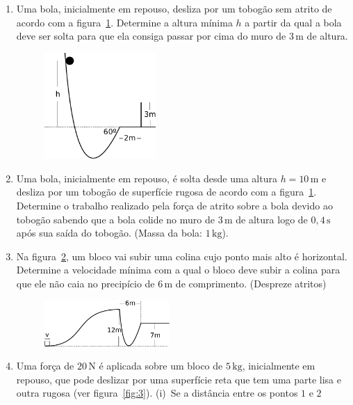 \documentclass[twocolumn=on,DIV=calc]{scrartcl}
\newcommand{\un}[1]{\mathrm{#1}}
\begin{document}
\begin{enumerate}
\item Uma bola, inicialmente em repouso, desliza por um tobogão sem
  atrito de acordo com a figura~\ref{fig:4}. Determine a altura mínima
  $h$ a partir da qual a bola deve ser solta para que ela consiga
  passar por cima do muro de $3\,\un m$ de altura.
  \begin{figure}[ht]
    \centering
    \includegraphics[width=0.4\textwidth,keepaspectratio]{lista5-questao4.pdf}
    \caption{}
    \label{fig:4}
  \end{figure}
\item Uma bola, inicialmente em repouso, é solta desde uma altura
  $h=10\,\un{m}$ e desliza por um tobogão de superfície rugosa de
  acordo com a figura~\ref{fig:4}. Determine o trabalho realizado pela
  força de atrito sobre a bola devido ao tobogão sabendo que a bola
  colide no muro de $3\,\un{m}$ de altura logo de $0{,}4\,\un{s}$ após
  sua saída do tobogão. (Massa da bola: $1\,\un{kg}$).
\item Na figura~\ref{fig:5}, um bloco vai subir uma colina cujo ponto
  mais alto é horizontal. Determine a velocidade mínima com a qual o
  bloco deve subir a colina para que ele não caia no precipício de
  $6\,\un{m}$ de comprimento. (Despreze atritos)
  \begin{figure}[ht]
    \centering
    \includegraphics[width=0.45\textwidth,keepaspectratio]{lista5-questao5.pdf}
    \caption{}
    \label{fig:5}
  \end{figure}
\item Uma força de $20\,\un N$ é aplicada sobre um bloco de
  $5\,\un{kg}$, inicialmente em repouso, que pode deslizar por uma
  superfície reta que tem uma parte lisa e outra rugosa (ver
  figura~\ref{fig:3}). (i)~Se a distância entre os pontos $1$ e $2$

\end{enumerate}
\end{document}
